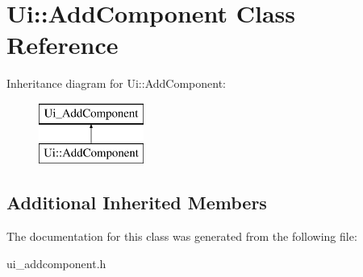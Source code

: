 \hypertarget{classUi_1_1AddComponent}{\section{Ui\-:\-:Add\-Component Class Reference}
\label{classUi_1_1AddComponent}
}
Inheritance diagram for Ui\-:\-:Add\-Component\-:\begin{figure}[H]
\begin{center}
\leavevmode
\includegraphics[height=2.000000cm]{classUi_1_1AddComponent}
\end{center}
\end{figure}
\subsection*{Additional Inherited Members}


The documentation for this class was generated from the following file\-:\begin{DoxyCompactItemize}
\item 
ui\-\_\-addcomponent.\-h\end{DoxyCompactItemize}
